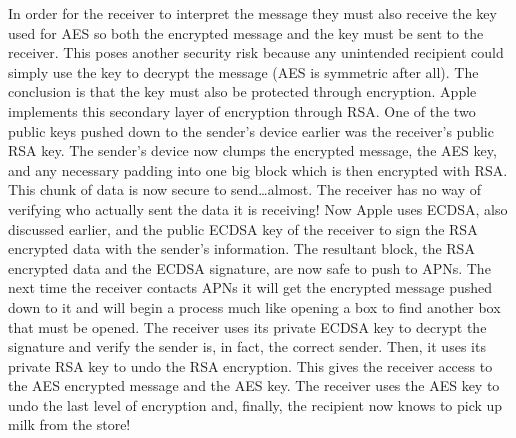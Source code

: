 In order for the receiver to interpret the message they must also receive the
key used for AES so both the encrypted message and the key must be sent to the
receiver.  This poses another security risk because any unintended recipient
could simply use the key to decrypt the message (AES is symmetric after all).
The conclusion is that the key must also be protected through encryption.
Apple implements this secondary layer of encryption through RSA.  One of the
two public keys pushed down to the sender's device earlier was the receiver's
public RSA key.  The sender's device now clumps the encrypted message, the AES
key, and any necessary padding into one big block which is then encrypted with
RSA.  This chunk of data is now secure to send\ldots almost.  The receiver has
no way of verifying who actually sent the data it is receiving!  Now Apple uses
ECDSA, also discussed earlier, and the public ECDSA key of the receiver to sign
the RSA encrypted data with the sender's information.  The resultant block, the
RSA encrypted data and the ECDSA signature, are now safe to push to APNs.  The
next time the receiver contacts APNs it will get the encrypted message pushed
down to it and will begin a process much like opening a box to find another box
that must be opened.  The receiver uses its private ECDSA key to decrypt the
signature and verify the sender is, in fact, the correct sender.  Then, it uses
its private RSA key to undo the RSA encryption.  This gives the receiver access
to the AES encrypted message and the AES key.  The receiver uses the AES key to
undo the last level of encryption and, finally, the recipient now knows to pick
up milk from the store!
